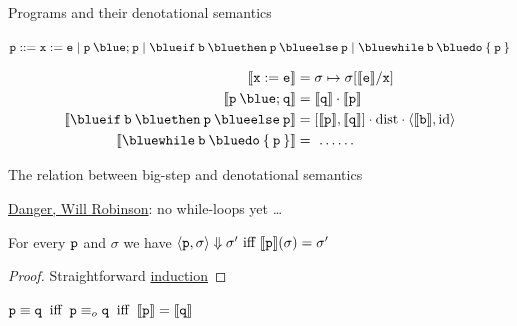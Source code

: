 \documentclass{beamer}
\begin{document}
\begin{frame}{Programs and their denotational semantics}
        \begin{block}{\vspace*{-3.5ex}}
        \begin{center}
        $\prog{p} ::= \mathtt{x} := \mathtt{e} \mid
	\mathtt{p \> {\blue ;} \> p} \mid
	\mathtt{{\blue if} \> b \> {\blue then} \> p \> {\blue else} \> p} \mid
	\mathtt{{\blue while} \> b \> {\blue do} \> \{ \> p \> \}}$
\end{center}
	\end{block}

        \begin{align*}
                \sem{\prog{x : = e}} & = \sigma \mapsto \sigma[\sem{\prog{e}}/\prog{x}] \\
                \sem{\prog{p} \> {\blue ;} \> \prog{q}} & 
                = \sem{\prog{q}} \comp \sem{\prog{p}} \\
                \sem{\mathtt{{\blue if} \> b \> {\blue then} \> p \> {\blue else} \> p}}
                                                        & 
                                                        = [\sem{\prog{p}},\sem{\prog{q}}] \comp
                                                        \mathrm{dist} \comp \pv{\sem{\prog{b}}}{\id}
                \\
                \sem{\mathtt{{\blue while} \> b \> {\blue do} \> \{ \> p \> \}} }
                                                        & =\  \dots \dots
        \end{align*}
\end{frame}

\begin{frame}{The relation between big-step and denotational semantics}

        \alert{\underline{Danger, Will Robinson}}: no while-loops yet \dots

        \vfill
        \begin{theorem}
                For every $\mathtt{p}$ and $\sigma$ we
                have 
                $\langle \mathtt{p}, \sigma \rangle \Downarrow \sigma' \text{ iff }
                \llbracket \mathtt{p} \rrbracket(\sigma) = \sigma'$
        \end{theorem}

        \begin{proof}
                Straightforward \alert{\underline{induction}}
        \end{proof}

        \bigskip
        \bigskip
        \begin{corollary}
                $\mathtt{p} \equiv \mathtt{q} \> \text{ iff } \>
                \mathtt{p} \equiv_o \mathtt{q} \> \text{ iff } \>
                \llbracket \mathtt{p} \rrbracket = \llbracket \mathtt{q} \rrbracket$
        \end{corollary}
\end{frame}
\end{document}
